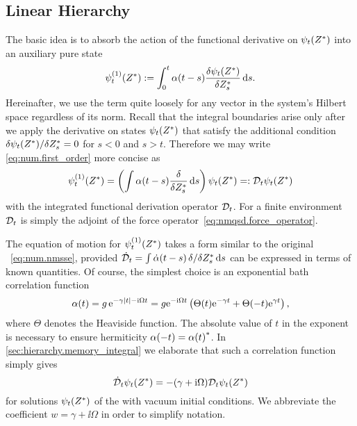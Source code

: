 \subsection{Linear Hierarchy}
\label{sub:num.sheom.lin}
%

The basic idea is to absorb the action of the functional derivative on $\psitZ$ into an auxiliary pure state
\begin{equation}
  \psitZ[1] := \int_0^t \alpha(t - s) \frac{\delta \psi_t(\ZZ)}{\delta \ZZ_s} \dd s.
  \label{eq:num.first_order}
\end{equation}
Hereinafter, we use the term  quite loosely for any vector in the system's Hilbert space regardless of its norm.
Recall that the integral boundaries arise only after we apply the derivative on states $\psi_t({Z}^*)$ that satisfy the additional condition $\delta \psitZ / \delta \ZZ_s = 0$ for $ s < 0$ and $s > t$.
Therefore we may write \autoref{eq:num.first_order} more concise as
\begin{equation*}
  \psitZ[1] = \left( \int \alpha(t - s) \frac{\delta}{\delta \ZZ_s} \dd s \right) \psitZ =: \adjZZ_t \psitZ
\end{equation*}
with the integrated functional derivation operator $\mathcal{D}_t$.
For a finite environment $\mathcal{D}_t$ is simply the adjoint of the force operator~\ref{eq:nmqsd.force_operator}.

The equation of motion for $\psitZ[1]$ takes a form similar to the original \NMSSE~\ref{eq:num.nmsse}, provided $\dot{\mathcal{D}}_t = \int\dot\alpha(t-s) \, \delta / \delta {Z}^*_s \, \mathrm{d} s$ can be expressed in terms of known quantities.
Of course, the simplest choice is an exponential bath correlation function
\begin{equation}
  \alpha(t) = g \, \exp[-\gamma \abs{t} - \ii \Omega t] = g \exp[-\ii \Omega t] \left( \Theta(t) \exp[-\gamma t] + \Theta(-t) \exp[\gamma t] \right),
  \label{eq:num.exp_bcf}
\end{equation}
where $\Theta$ denotes the Heaviside function.
The absolute value of $t$ in the exponent is necessary to ensure hermiticity $\alpha(-t) = {\alpha(t)}^*$.
In \autoref{sec:hierarchy.memory_integral} we elaborate that such a correlation function simply gives
\begin{equation}
  \dot\adjZZ_t \psitZ = - (\gamma + \ii \Omega) \adjZZ_t\psitZ
  \label{eq:num.dot_adjZZt}
\end{equation}
for solutions $\psitZ$ of the \NMSSE with vacuum initial conditions.
We abbreviate the coefficient $w = \gamma + \ii\Omega$ in order to simplify notation.\\



